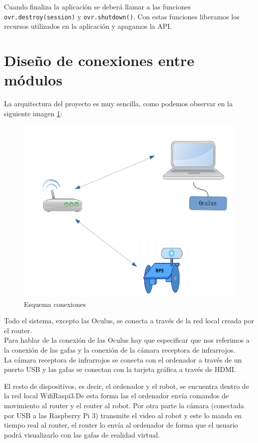 \documentclass[twoside, 11pt]{epstfg}
\begin{document}
Cuando finaliza la aplicación se deberá llamar a las funciones \texttt{ovr.destroy(session)} y \texttt{ovr.shutdown()}. Con estas funciones liberamos los recursos utilizados en la aplicación y apagamos la API.

\section{Diseño de conexiones entre módulos}

La arquitectura del proyecto es muy sencilla, como podemos observar en la siguiente imagen \ref{Fig::EsquemaConexiones}:

\begin{figure}[h]
	\centerline{
		\mbox{\includegraphics[width=.80\textwidth]{images/EsquemaConexiones.png}}
	}
	\caption{Esquema conexiones}
	\label{Fig::EsquemaConexiones}
\end{figure}


Todo el sistema, excepto las Oculus, se conecta a través de la red local creada por el router.\\
Para hablar de la conexión de las Oculus hay que especificar que nos referimos a la conexión de las gafas y la conexión de la cámara receptora de infrarrojos.\\
La cámara receptora de infrarrojos se conecta con el ordenador a través de un puerto USB y las gafas se conectan con la tarjeta gráfica a través de HDMI.

El resto de dispositivos, es decir, el ordenador y el robot, se encuentra dentro de la red local WifiRaspi3.De esta forma las el ordenador envía comandos de movimiento al router y el router al robot. Por otra parte la cámara (conectada por USB a las Raspberry Pi 3) transmite el video al robot y este lo manda en tiempo real al router, el router lo envía al ordenador de forma que el usuario podrá visualizarlo con las gafas de realidad virtual.
\end{document}

